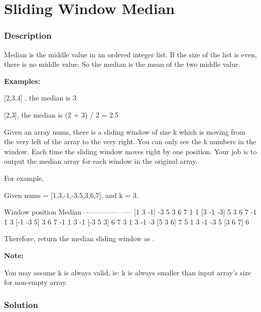 \newpage

\section{Sliding Window Median} %

\subsubsection{Description}
Median is the middle value in an ordered integer list. If the size of the list is even, there is no middle value. So the median is the mean of the two middle value.

\textbf{Examples:}

[2,3,4] , the median is 3

[2,3], the median is (2 + 3) / 2 = 2.5

Given an array nums, there is a sliding window of size k which is moving from the very left of the array to the very right. You can only see the k numbers in the window. Each time the sliding window moves right by one position. Your job is to output the median array for each window in the original array.

For example,

Given nums = [1,3,-1,-3,5,3,6,7], and k = 3.
\begin{Code}
Window position                Median
---------------               -----
[1  3  -1] -3  5  3  6  7       1
 1 [3  -1  -3] 5  3  6  7       -1
 1  3 [-1  -3  5] 3  6  7       -1
 1  3  -1 [-3  5  3] 6  7       3
 1  3  -1  -3 [5  3  6] 7       5
 1  3  -1  -3  5 [3  6  7]      6
 \end{Code}

Therefore, return the median sliding window as \code{[1,-1,-1,3,5,6]}.

\textbf{Note:}

You may assume k is always valid, ie: k is always smaller than input array's size for non-empty array.

\subsubsection{Solution}

